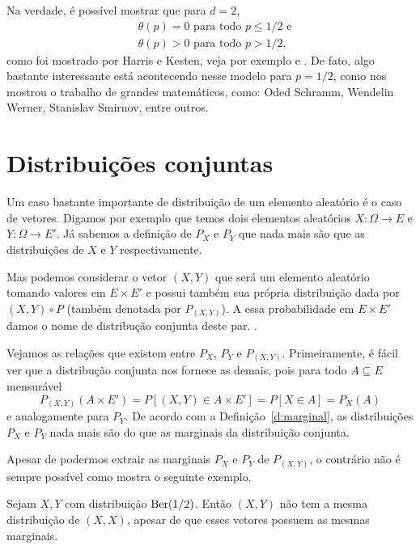 \begin{topics}
Na verdade, é possível mostrar que para $d = 2$,
\begin{equation}
  \begin{split}
    & \text{$\theta(p) = 0$ para todo $p \leq 1/2$ e}\\
    & \text{$\theta(p) > 0$ para todo $p > 1/2$,}
  \end{split}
\end{equation}
como foi mostrado por Harris e Kesten, veja por exemplo \cite{Gri99} e \cite{bollobas2006percolation}.
De fato, algo bastante interessante está acontecendo nesse modelo para $p = 1/2$, como nos mostrou o trabalho de grandes matemáticos, como: Oded Schramm, Wendelin Werner, Stanislav Smirnov, entre outros.


\end{topics}

\section{Distribuições conjuntas}

Um caso bastante importante de distribuição de um elemento aleatório é o caso de vetores.
Digamos por exemplo que temos dois elementos aleatórios $X:\Omega \to E$ e $Y:\Omega \to E'$.
Já sabemos a definição de $P_X$ e $P_{Y}$ que nada mais são que as distribuições de $X$ e $Y$ respectivamente.

Mas podemos considerar o vetor $(X, Y)$ que será um elemento aleatório tomando valores em $E \times E'$ e possui também sua própria distribuição dada por $(X, Y) \circ P$ (também denotada por $P_{(X, Y)}$).
A essa probabilidade em $E \times E'$ damos o nome de distribução conjunta deste par. .

Vejamos as relações que existem entre $P_X$, $P_Y$ e $P_{(X,Y)}$.
Primeiramente, é fácil ver que a distribução conjunta nos fornece as demais, pois para todo $A \subseteq E$ mensurável
\begin{equation}
  P_{(X,Y)}(A \times E') = P[(X, Y) \in A \times E'] = P[X \in A] = P_X(A)
\end{equation}
e analogamente para $P_Y$.
De acordo com a Definição~\ref{d:marginal}, as distribuições $P_X$ e $P_Y$ nada mais são do que as marginais da distribuição conjunta.

Apesar de podermos extrair as marginais $P_X$ e $P_Y$ de $P_{(X,Y)}$, o contrário não é sempre possível como mostra o seguinte exemplo.
\begin{example}
  Sejam $X, Y$ \iid com distribuição $\operatorname{Ber}(1/2)$.
  Então $(X, Y)$ não tem a mesma distribuição de $(X, X)$, apesar de que esses vetores possuem as mesmas marginais.
\end{example}

